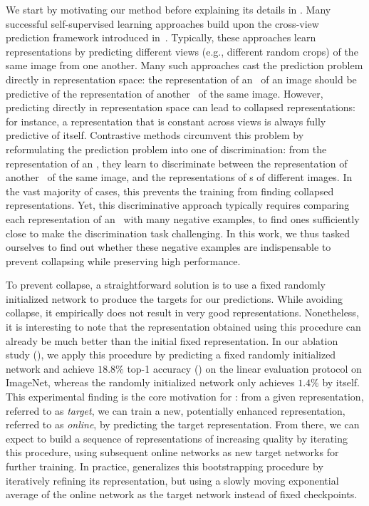 We start by motivating our method before explaining its details in . Many successful self-supervised learning approaches build upon the cross-view prediction framework introduced in~\cite{becker1992self}. Typically, these approaches learn representations  by predicting different views (e.g., different random crops) 
of the same image from one another. Many such  approaches cast the prediction problem directly in representation space: the representation of an  \augview~of an image should be predictive of the representation of another \augview~of the same image. However, predicting directly in representation space can lead to collapsed representations: for instance, a representation that is constant across views is always fully predictive of itself. Contrastive methods circumvent this problem by reformulating the prediction problem into one of discrimination: from the representation of an \augview, they learn to discriminate between the representation of another \augview~of the same image, and the representations of \augview s of different images. In the vast majority of cases, this prevents the training from finding collapsed representations. Yet, this discriminative approach typically requires comparing each representation of an \augview~with many negative examples, to find ones sufficiently close to make the discrimination task challenging. In this work, we thus tasked ourselves to find out whether these negative examples are indispensable to prevent collapsing while preserving high performance.

To prevent collapse, a straightforward solution is to use a fixed randomly initialized network to produce the targets for our predictions. While avoiding collapse, it empirically does not result in very good representations. Nonetheless, it is interesting to note that the representation obtained using this procedure can already be much better than the initial fixed representation. In our ablation study (), we apply this procedure by predicting a fixed randomly initialized network and achieve $18.8\%$ top-1 accuracy () on the linear evaluation protocol on ImageNet, whereas the randomly initialized network only achieves $1.4\%$ by itself. This experimental finding is the core motivation for \algo: from a given representation, referred to as \textit{target}, we can train a new, potentially enhanced representation, referred to as \textit{online}, by predicting the target representation. From there, we can expect to build a sequence of representations of increasing quality by iterating this procedure, using subsequent online networks as new target networks for further training. In practice, \algo generalizes this bootstrapping procedure by iteratively refining its representation, but using a slowly moving exponential average of the online network as the target network instead of fixed checkpoints.

